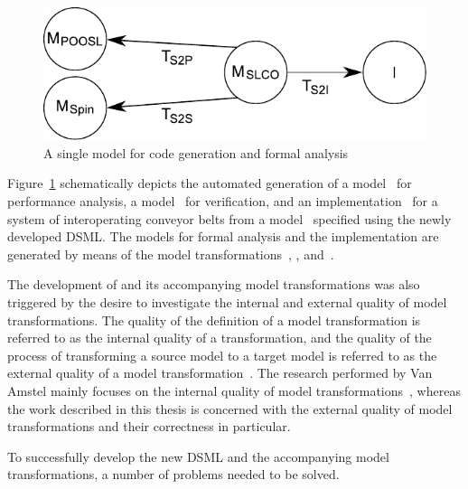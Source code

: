 \begin{figure}[hbt]
 \centering
 \includegraphics[scale=0.7]{introduction/figs/dsml-to-poosl}
 \caption{A single \SLCO model for code generation and formal analysis}
 \label{fig:introduction:dsml-to-poosl}
\end{figure}

Figure~\ref{fig:introduction:dsml-to-poosl} schematically depicts the automated generation of a model~ for performance analysis, a model~ for verification, and an implementation~\Implementation{} for a system of interoperating conveyor belts from a model~ specified using the newly developed DSML.
The models for formal analysis and the implementation are generated by means of the model transformations~, , and~.

The development of \SLCO and its accompanying model transformations was also triggered by the desire to investigate the internal and external quality of model transformations.
The quality of the definition of a model transformation is referred to as the internal quality of a transformation, and the quality of the process of transforming a source model to a target model is referred to as the external quality of a model transformation~\cite{AmstelThesis2011}.
The research performed by Van Amstel mainly focuses on the internal quality of model transformations~\cite{AmstelThesis2011}, whereas the work described in this thesis is concerned with the external quality of model transformations and their correctness in particular.

To successfully develop the new DSML and the accompanying model transformations, a number of problems needed to be solved. 